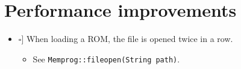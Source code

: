\documentclass[12pt,a4paper]{extarticle}
\newcommand{\notdone}{\makebox[1em][l]{$\square$}}
\begin{document}
\section{Performance improvements}

\begin{itemize}
  \item[\notdone] When loading a ROM, the file is opened twice in a row.
    \begin{itemize}
      \item See \texttt{Memprog::fileopen(String path)}.
    \end{itemize}
  \end{itemize}
\end{document}
